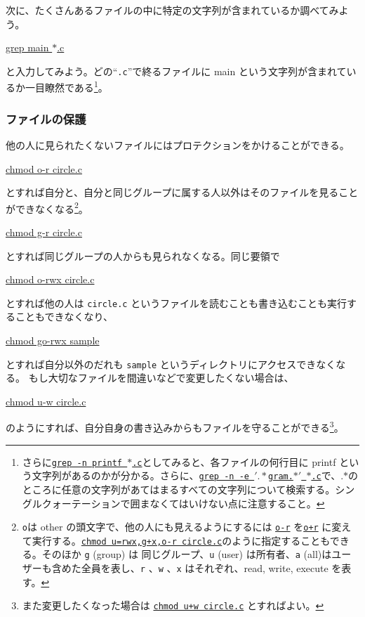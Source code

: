 次に、たくさんあるファイルの中に特定の文字列が含まれているか調べてみよう。
\begin{commandline2}
    \prompt \underline{grep main \(\ast\).c}
\end{commandline2} \noindent
と入力してみよう。どの``\texttt{.c}''で終るファイルに main という文字列が含まれているか一目瞭然である\footnote{さらに\texttt{\underline{grep -n printf \(\ast\).c}}としてみると、各ファイルの何行目に printf という文字列があるのかが分かる。さらに、\texttt{\underline{grep -n -e \('.\ast\)gram.\(\ast'\) \(\ast\).c}}で、.\(\ast\)のところに任意の文字列があてはまるすべての文字列について検索する。シングルクォーテーションで囲まなくてはいけない点に注意すること。}。

\subsubsection*{ファイルの保護}
他の人に見られたくないファイルにはプロテクションをかけることができる。
\begin{commandline2}
    \prompt \underline{chmod o-r circle.c}
\end{commandline2} \noindent
とすれば自分と、自分と同じグループに属する人以外はそのファイルを見ることができなくなる\footnote{\texttt{o}は other の頭文字で、他の人にも見えるようにするには \underline{\texttt{o-r}} を\underline{\texttt{o+r}} に変えて実行する。\underline{\texttt{chmod u=rwx,g+x,o-r circle.c}}のように指定することもできる。そのほか \texttt{g} (group) は 同じグループ、\texttt{u} (user) は所有者、\texttt{a} (all)はユーザーも含めた全員を表し、\texttt{r} 、\texttt{w} 、\texttt{x} はそれぞれ、read, write, execute を表す。}。
\begin{commandline2}
    \prompt \underline{chmod g-r circle.c}
\end{commandline2} \noindent
とすれば同じグループの人からも見られなくなる。同じ要領で
\begin{commandline2}
    \prompt \underline{chmod o-rwx circle.c}
\end{commandline2} \noindent
とすれば他の人は \texttt{circle.c} というファイルを読むことも書き込むことも実行することもできなくなり、
\begin{commandline2}
    \prompt \underline{chmod go-rwx sample}
\end{commandline2} \noindent
とすれば自分以外のだれも \texttt{sample} というディレクトリにアクセスできなくなる。
もし大切なファイルを間違いなどで変更したくない場合は、
\begin{commandline2}
    \prompt \underline{chmod u-w circle.c}
\end{commandline2} \noindent
のようにすれば、自分自身の書き込みからもファイルを守ることができる\footnote{また変更したくなった場合は \underline{\texttt{chmod u+w circle.c}} とすればよい。}。

